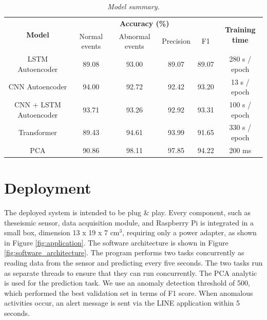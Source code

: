 \begin{table}[H]
  \begin{center}
    \caption[Model summary.]{\emph{Model summary.} \\ \hspace{\textwidth}}\label{tab:modelsum}
    \begin{tabular}{c c c c c c c}
      \hline
      \multicolumn{2}{c}{\multirow{2}{*}{\textbf{Model}}} & \multicolumn{4}{c}{\textbf{Accuracy (\%)}} & \multirow{2}{*}{\textbf{Training time}}                                                 \\
      \cline{3-6}
                                                          &                                            & Normal events                           & Abnormal events & Precision & F1            & \\
      \hline
      \multicolumn{2}{c}{  LSTM Autoencoder }             & 89.08                                      & 93.00                                   & 89.07           & 89.07     & 280 s / epoch   \\
      \multicolumn{2}{c}{ CNN Autoencoder }               & 94.00                                      & 92.72                                   & 92.42           & 93.20     & 13 s / epoch    \\
      \multicolumn{2}{c}{ CNN + LSTM Autoencoder }        & 93.71                                      & 93.26                                   & 92.92           & 93.31     & 100 s / epoch   \\
      \multicolumn{2}{c}{ Transformer }                   & 89.43                                      & 94.61                                   & 93.99           & 91.65     & 330 s / epoch   \\
      \multicolumn{2}{c}{ PCA }                           & 90.86                                      & 98.11                                   & 97.85           & 94.22     & 200 ms          \\
      \hline
    \end{tabular}
  \end{center}
\end{table}

\section{Deployment}
The deployed system is intended to be plug \& play. Every component, such as theseismic sensor, data acquisition module, and Raspberry Pi is integrated in a small box, dimension 13 x 19 x 7 $\mathrm{cm}^{3}$, requiring only a power adapter, as shown in Figure \ref{fig:application}. The software architecture is shown in Figure \ref{fig:software_architecture}. The program performs two tasks concurrently as reading data from the sensor and predicting every five seconds. The two tasks run as separate threads to ensure that they can run concurrently. The PCA analytic is used for the prediction task. We use an anomaly detection threshold of 500, which performed the best validation set in terms of F1 score. When anomalous activities occur, an alert message is sent via the LINE application within 5 seconds. 

